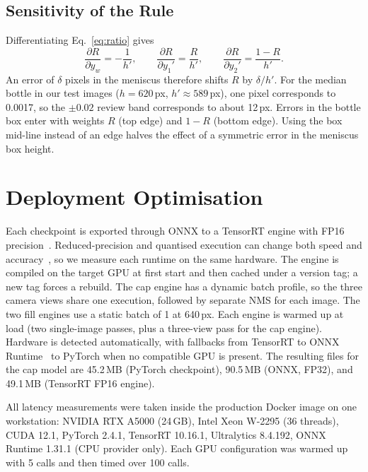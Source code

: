 \documentclass[conference]{IEEEtran}
\begin{document}
\subsection{Sensitivity of the Rule}
\label{sec:sens}
Differentiating Eq.~\eqref{eq:ratio} gives
\begin{equation}
\frac{\partial R}{\partial y_w}=-\frac{1}{h'},\qquad \frac{\partial R}{\partial y_1'}=\frac{R}{h'},\qquad \frac{\partial R}{\partial y_2'}=\frac{1-R}{h'}.
\end{equation}
An error of $\delta$ pixels in the meniscus therefore shifts $R$ by $\delta/h'$. For the median bottle in our test images ($h{=}620$\,px, $h'{\approx}589$\,px), one pixel corresponds to 0.0017, so the $\pm0.02$ review band corresponds to about 12\,px. Errors in the bottle box enter with weights $R$ (top edge) and $1{-}R$ (bottom edge). Using the box mid-line instead of an edge halves the effect of a symmetric error in the meniscus box height.

\section{Deployment Optimisation}
\label{sec:deploy}
Each checkpoint is exported through ONNX to a TensorRT engine with FP16 precision~\cite{micikevicius2018,tensorrt}. Reduced-precision and quantised execution can change both speed and accuracy~\cite{jacob2018}, so we measure each runtime on the same hardware. The engine is compiled on the target GPU at first start and then cached under a version tag; a new tag forces a rebuild. The cap engine has a dynamic batch profile, so the three camera views share one execution, followed by separate NMS for each image. The two fill engines use a static batch of 1 at 640\,px. Each engine is warmed up at load (two single-image passes, plus a three-view pass for the cap engine). Hardware is detected automatically, with fallbacks from TensorRT to ONNX Runtime~\cite{onnxruntime} to PyTorch when no compatible GPU is present. The resulting files for the cap model are 45.2\,MB (PyTorch checkpoint), 90.5\,MB (ONNX, FP32), and 49.1\,MB (TensorRT FP16 engine).

All latency measurements were taken inside the production Docker image on one workstation: NVIDIA RTX A5000 (24\,GB), Intel Xeon W-2295 (36 threads), CUDA 12.1, PyTorch 2.4.1, TensorRT 10.16.1, Ultralytics 8.4.192, ONNX Runtime 1.31.1 (CPU provider only). Each GPU configuration was warmed up with 5 calls and then timed over 100 calls.
\end{document}

